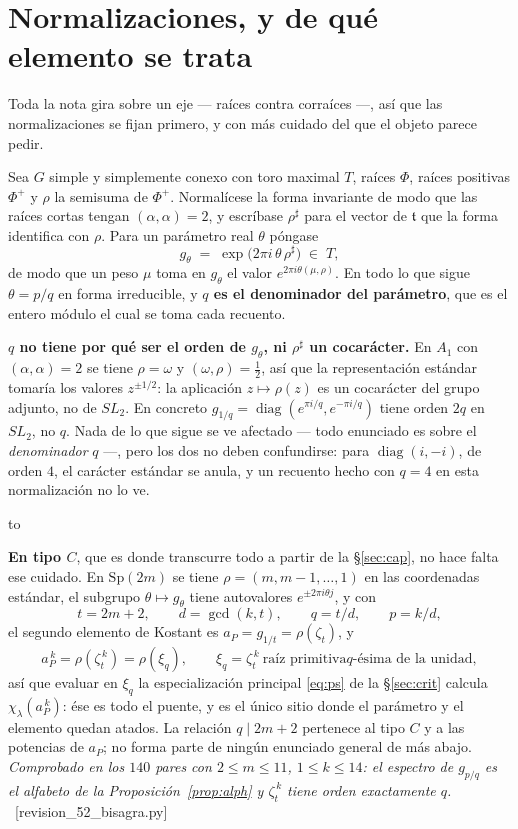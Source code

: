 \documentclass[11pt,a4paper]{article}
\newcommand{\Sp}{\mathrm{Sp}}
\newcommand{\ver}[1]{\unskip\penalty0\ \textcolor{azul}{\small\textsf{[#1]}}}
\newenvironment{keybox}
  {\par\vspace{9pt}\begin{lrbox}{\fichabox}%
   \begin{minipage}{0.90\textwidth}\vspace{7pt}\setlength{\parskip}{3pt}}
  {\vspace{7pt}\end{minipage}\end{lrbox}%
   \par\noindent\hbox to \textwidth{\hfill
   \textcolor{azul}{\rule[-\dp\fichabox]{3.2pt}{\dimexpr\ht\fichabox+\dp\fichabox\relax}}%
   \colorbox{fondoficha}{\usebox{\fichabox}}\hfill}%
   \par\vspace{9pt}}
\begin{document}
\section{Normalizaciones, y de qué elemento se trata}\label{sec:norm}

Toda la nota gira sobre un eje --- raíces contra corraíces ---, así que las normalizaciones se fijan
primero, y con más cuidado del que el objeto parece pedir.

Sea $G$ simple y simplemente conexo con toro maximal $T$, raíces $\Phi$, raíces positivas $\Phi^+$ y
$\rho$ la semisuma de $\Phi^+$. Normalícese la forma invariante de modo que las raíces cortas tengan
$(\alpha,\alpha)=2$, y escríbase $\rho^\sharp$ para el vector de $\mathfrak t$ que la forma
identifica con $\rho$. Para un parámetro real $\theta$ póngase
\begin{equation}\label{eq:gtheta}
g_\theta \;=\; \exp\bigl(2\pi i\,\theta\,\rho^\sharp\bigr)\;\in\;T ,
\end{equation}
de modo que un peso $\mu$ toma en $g_\theta$ el valor $e^{2\pi i\theta(\mu,\rho)}$. En todo lo que
sigue $\theta=p/q$ en forma irreducible, y \textbf{$q$ es el denominador del parámetro}, que es el
entero módulo el cual se toma cada recuento.

\begin{keybox}
\textbf{$q$ no tiene por qué ser el orden de $g_\theta$, ni $\rho^\sharp$ un cocarácter.} En $A_1$
con $(\alpha,\alpha)=2$ se tiene $\rho=\omega$ y $(\omega,\rho)=\tfrac12$, así que la representación
estándar tomaría los valores $z^{\pm1/2}$: la aplicación $z\mapsto\rho(z)$ es un cocarácter del grupo
adjunto, no de $SL_2$. En concreto $g_{1/q}=\operatorname{diag}(e^{\pi i/q},e^{-\pi i/q})$ tiene
orden $2q$ en $SL_2$, no $q$. Nada de lo que sigue se ve afectado --- todo enunciado es sobre el
\emph{denominador} $q$ ---, pero los dos no deben confundirse: para
$\operatorname{diag}(i,-i)$, de orden $4$, el carácter estándar se anula, y un recuento hecho con
$q=4$ en esta normalización no lo ve.
\end{keybox}

\noindent \textbf{En tipo $C$}, que es donde transcurre todo a partir de la \S\ref{sec:cap}, no hace
falta ese cuidado. En $\Sp(2m)$ se tiene $\rho=(m,m-1,\dots,1)$ en las coordenadas estándar, el
subgrupo $\theta\mapsto g_\theta$ tiene autovalores $e^{\pm2\pi i\theta j}$, y con
\[
t=2m+2,\qquad d=\gcd(k,t),\qquad q=t/d,\qquad p=k/d,
\]
el segundo elemento de Kostant es $a_P=g_{1/t}=\rho(\zeta_t)$, y
\[
a_P^{\,k}=\rho(\zeta_t^{\,k})=\rho(\xi_q),\qquad \xi_q=\zeta_t^{\,k}\ \text{raíz primitiva
$q$-ésima de la unidad},
\]
así que evaluar en $\xi_q$ la especialización principal \eqref{eq:ps} de la \S\ref{sec:crit}
calcula $\chi_\lambda(a_P^{\,k})$: ése es todo el puente, y es el único sitio donde el parámetro y el
elemento quedan atados. La relación $q\mid 2m+2$ pertenece al tipo $C$ y a las potencias de $a_P$;
no forma parte de ningún enunciado general de más abajo. \emph{Comprobado en los $140$ pares con $2\le m\le11$, $1\le k\le14$: el espectro de
$g_{p/q}$ es el alfabeto de la Proposición~\ref{prop:alph} y $\zeta_t^{\,k}$ tiene orden exactamente
$q$.} \ver{revision\_52\_bisagra.py}
\end{document}
